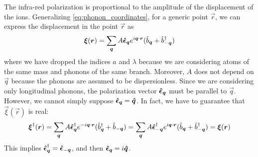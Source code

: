The infra-red polarization is proportional to the amplitude of the displacement of the ions. Generalizing \cref{eq:phonon_coordinates}, for a generic point $\vec{r}$, we can express the displacement in the point $\vec{r}$ as
\begin{equation}
    \vec{\xi}(\vec{r}) = \sum_{\vec{q}} A \vers{\epsilon}_{\vec{q}} e^{i\vec{q} \cdot \vec{r}} (\oper{b}_{\vec{q}} + \adjop{b}_{-\vec{q}})
\end{equation}
where we have dropped the indices $a$ and $\lambda$ because we are considering atoms of the same mass and phonons of the same branch. Moreover, $A$ does not depend on $\vec{q}$ because the phonons are assumed to be dispersionless. Since we are considering only longitudinal phonons, the polarization vector $\vers{\epsilon}_{\vec{q}}$ must be parallel to $\vec{q}$. However, we cannot simply suppose $\vers{\epsilon}_{\vec{q}} = \vers{q}$. In fact, we have to guarantee that $\vec{\xi}(\vec{r})$ is real:
\begin{equation}
    \vec{\xi}^\dagger(\vec{r}) = \sum_{\vec{q}} A \vers{\epsilon}_{\vec{q}}^\dagger e^{-i\vec{q} \cdot \vec{r}} (\adjop{b}_{\vec{q}} + \oper{b}_{-\vec{q}})
    = \sum_{\vec{q}} A \vers{\epsilon}_{-\vec{q}}^\dagger e^{i\vec{q} \cdot \vec{r}} (\oper{b}_{\vec{q}} + \adjop{b}_{-\vec{q}})
    = \vec{\xi}(\vec{r})
\end{equation}
This implies $\vers{\epsilon}_{\vec{q}}^\dagger = \vers{\epsilon}_{-\vec{q}}$, and then $\vers{\epsilon}_{\vec{q}} = i\vers{q}$.

